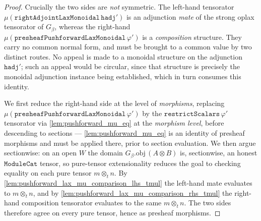 \begin{proof}
  \leanok
  Crucially the two sides are \emph{not} symmetric. The left-hand tensorator
  \(\mu(\mathtt{rightAdjointLaxMonoidal}\,\mathtt{hadj}')\) is an adjunction \emph{mate} of the strong
  oplax tensorator of \(G_\beta\), whereas the right-hand
  \(\mu(\mathtt{presheafPushforwardLaxMonoidal}\,\varphi')\) is a \emph{composition} structure. They
  carry no common normal form, and must be brought to a common value by two distinct routes. No
  appeal is made to a monoidal structure on the adjunction \(\mathtt{hadj}'\); such an appeal would
  be circular, since that structure is precisely the monoidal adjunction instance being established,
  which in turn consumes this identity.

  We first reduce the right-hand side at the level of \emph{morphisms}, replacing
  \(\mu(\mathtt{presheafPushforwardLaxMonoidal}\,\varphi')\) by the
  \(\mathtt{restrictScalars}\,\varphi'\) tensorator via \cref{lem:pushforward_mu_eq} at the
  \emph{morphism level}, before descending to sections --- \cref{lem:pushforward_mu_eq} is an
  identity of presheaf morphisms and must be applied there, prior to section evaluation. We then argue sectionwise: on an open \(W\) the domain
  \(G_\beta.\mathrm{obj}\,(A \otimes B)\) is, sectionwise, an honest \(\mathtt{ModuleCat}\) tensor, so
  pure-tensor extensionality reduces the goal to checking equality on each pure tensor
  \(m \otimes_t n\). By \cref{lem:pushforward_lax_mu_comparison_lhs_tmul} the left-hand mate evaluates
  to \(m \otimes_t n\), and by \cref{lem:pushforward_lax_mu_comparison_rhs_tmul} the right-hand
  composition tensorator evaluates to the same \(m \otimes_t n\). The two sides therefore agree on
  every pure tensor, hence as presheaf morphisms.
\end{proof}

